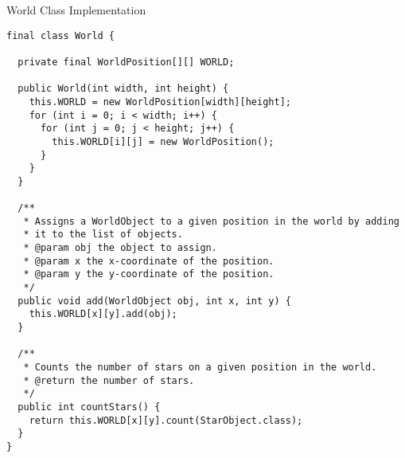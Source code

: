 \begin{cl}[]{World Class Implementation}
\begin{lstlisting}[language=MyJava]
final class World {
  
  private final WorldPosition[][] WORLD;

  public World(int width, int height) {
    this.WORLD = new WorldPosition[width][height];
    for (int i = 0; i < width; i++) {
      for (int j = 0; j < height; j++) {
        this.WORLD[i][j] = new WorldPosition();
      }
    }
  }

  /**
   * Assigns a WorldObject to a given position in the world by adding
   * it to the list of objects.
   * @param obj the object to assign.
   * @param x the x-coordinate of the position.
   * @param y the y-coordinate of the position.
   */
  public void add(WorldObject obj, int x, int y) {
    this.WORLD[x][y].add(obj);
  }

  /**
   * Counts the number of stars on a given position in the world.
   * @return the number of stars.
   */
  public int countStars() {
    return this.WORLD[x][y].count(StarObject.class);
  }
}
\end{lstlisting}
\end{cl}
